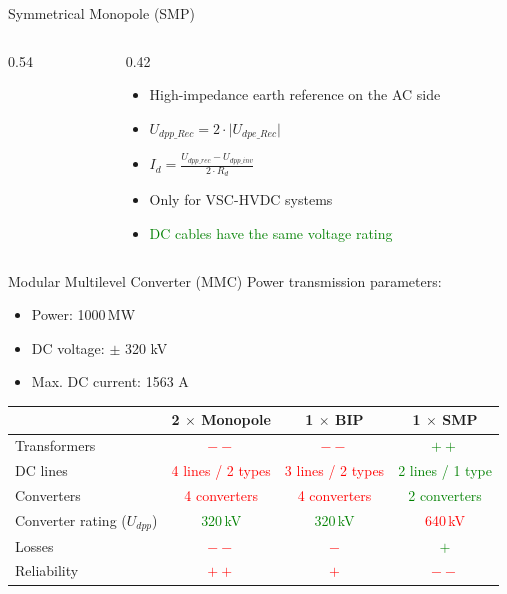 \documentclass[aspectratio=169,11pt]{beamer}
\newcommand{\figfolder}{fig/}
\begin{document}
\begin{frame}{Symmetrical Monopole (SMP)}
  \begin{columns}[c,onlytextwidth]
    \begin{column}{0.54\textwidth}\centering
      \topoimg[width=\linewidth,height=0.72\textheight,keepaspectratio]{\figfolder smp}
    \end{column}
    \begin{column}{0.42\textwidth}
      \begin{itemize}
        \setlength{\itemsep}{0.25em}
        \item High-impedance earth reference on the AC side
        \item $U_{dpp\_Rec}= 2 \cdot \lvert U_{dpe\_Rec} \rvert$
        \item $I_d=\frac{U_{dpp\_rec} - U_{dpp\_inv}}{2 \cdot R_d}$
        \item Only for VSC-HVDC systems
        \item \textcolor{green}{DC cables have the same voltage rating} 
      \end{itemize}
    \end{column}
  \end{columns}
\end{frame}

\begin{frame}{Modular Multilevel Converter (MMC)}
  Power transmission parameters:
  \begin{itemize}
    \item Power: 1000\,MW
    \item DC voltage: $\pm$ 320 kV
    \item Max. DC current: 1563 A
  \end{itemize}
  \vspace{0.6em}

  \centering
  \renewcommand{\arraystretch}{1.3}
  \begin{tabular}{@{}l c c c@{}}
     & \textbf{2 $\times$ Monopole} & \textbf{1 $\times$ BIP} & \textbf{1 $\times$ SMP} \\
    \hline
    Transformers      & \textcolor{red}{$--$} & \textcolor{red}{$--$} & \textcolor{green}{$++$} \\
    DC lines          & \textcolor{red}{4 lines / 2 types} & \textcolor{red}{3 lines / 2 types} & \textcolor{green}{2 lines / 1 type}\\
    Converters        & \textcolor{red}{4 converters} & \textcolor{red}{4 converters} & \textcolor{green}{2 converters}\\
    Converter rating ($U_{dpp}$) & \textcolor{green}{320\,kV} & \textcolor{green}{320\,kV} & \textcolor{red}{640\,kV} \\
    Losses            & \textcolor{red}{$--$} & \textcolor{red}{$-$} & \textcolor{green}{$+$} \\
    Reliability       & \textcolor{red}{$++$} & \textcolor{red}{$+$} & \textcolor{red}{$--$} \\
    \hline
  \end{tabular}
\end{frame}
\end{document}
